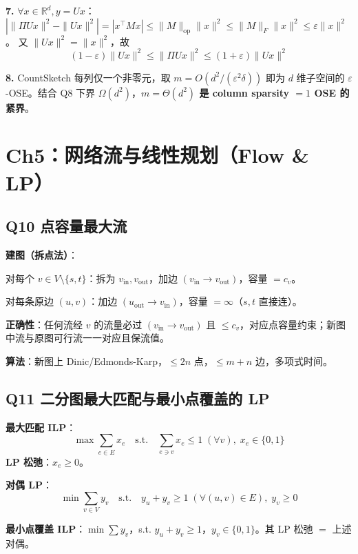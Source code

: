 \documentclass[11pt,a4paper]{ctexart}
\newcommand{\R}{\mathbb{R}}
\begin{document}
\textbf{7.} $\forall x\in\R^d, y=Ux$：
$|\|\Pi Ux\|^2 - \|Ux\|^2| = |x^\top M x| \leq \|M\|_{\text{op}}\|x\|^2 \leq \|M\|_F\|x\|^2 \leq \varepsilon\|x\|^2$。
又 $\|Ux\|^2 = \|x\|^2$，故
\[
\boxed{(1-\varepsilon)\|Ux\|^2 \leq \|\Pi Ux\|^2 \leq (1+\varepsilon)\|Ux\|^2}
\]

\textbf{8.} CountSketch 每列仅一个非零元，取 $m=O(d^2/(\varepsilon^2\delta))$ 即为 $d$ 维子空间的 $\varepsilon$-OSE。结合 Q8 下界 $\Omega(d^2)$，\textbf{$m=\Theta(d^2)$ 是 column sparsity $=1$ OSE 的紧界}。


\section*{Ch5：网络流与线性规划（Flow \& LP）}

\subsection*{Q10 \quad 点容量最大流}

\textbf{建图（拆点法）}：

对每个 $v \in V\setminus\{s,t\}$：拆为 $v_{\text{in}}, v_{\text{out}}$，加边 $(v_{\text{in}} \to v_{\text{out}})$，容量 $= c_v$。

对每条原边 $(u,v)$：加边 $(u_{\text{out}} \to v_{\text{in}})$，容量 $= \infty$（$s,t$ 直接连）。

\textbf{正确性}：任何流经 $v$ 的流量必过 $(v_{\text{in}}\to v_{\text{out}})$ 且 $\leq c_v$，对应点容量约束；新图中流与原图可行流一一对应且保流值。

\textbf{算法}：新图上 Dinic/Edmonds-Karp，$\leq 2n$ 点，$\leq m+n$ 边，多项式时间。


\subsection*{Q11 \quad 二分图最大匹配与最小点覆盖的 LP}

\textbf{最大匹配 ILP}：
\[
\max \sum_{e\in E} x_e \quad\text{s.t.}\quad \sum_{e\ni v} x_e \leq 1\;( \forall v),\; x_e \in \{0,1\}
\]
\textbf{LP 松弛}：$x_e \geq 0$。

\textbf{对偶 LP}：
\[
\min \sum_{v\in V} y_v \quad\text{s.t.}\quad y_u + y_v \geq 1\;(\forall (u,v)\in E),\; y_v \geq 0
\]

\textbf{最小点覆盖 ILP}：$\min\sum y_v$，s.t. $y_u+y_v\geq 1$，$y_v\in\{0,1\}$。其 LP 松弛 $=$ 上述对偶。
\end{document}
